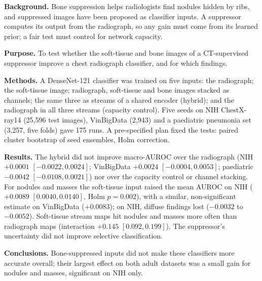 \textbf{Background.} Bone suppression helps radiologists find nodules hidden by ribs, and suppressed images have been proposed as
classifier inputs. A suppressor computes its output from the radiograph, so any gain must come from its learned prior; a fair test must
control for network capacity.

\textbf{Purpose.} To test whether the soft-tissue and bone images of a CT-supervised suppressor improve a chest radiograph classifier,
and for which findings.

\textbf{Methods.} A DenseNet-121 classifier was trained on five inputs: the radiograph; the soft-tissue image; radiograph,
soft-tissue and bone images stacked as channels; the same three as streams of a shared encoder (hybrid); and the radiograph in all
three streams (capacity control). Five seeds on NIH ChestX-ray14 (25,596 test images), VinBigData (2,943) and a paediatric pneumonia set
(3,257, five folds) gave 175 runs. A pre-specified plan fixed the tests: paired cluster bootstrap of seed ensembles, Holm correction.

\textbf{Results.} The hybrid did not improve macro-AUROC over the radiograph (NIH $+0.0001$ $[-0.0022,0.0024]$; VinBigData
$+0.0024$ $[-0.0004,0.0053]$; paediatric $-0.0042$ $[-0.0108,0.0021]$) nor over the capacity control or channel stacking. For nodules
and masses the soft-tissue input raised the mean AUROC on NIH ($+0.0089$ $[0.0040,0.0140]$, Holm $p=0.002$), with a similar,
non-significant estimate on VinBigData ($+0.0083$); on NIH, diffuse findings lost ($-0.0032$ to $-0.0052$). Soft-tissue stream maps hit
nodules and masses more often than radiograph maps (interaction $+0.145$ $[0.092,0.199]$). The suppressor's uncertainty did not
improve selective classification.

\textbf{Conclusions.} Bone-suppressed inputs did not make these classifiers more accurate overall; their largest effect on both adult
datasets was a small gain for nodules and masses, significant on NIH only.
